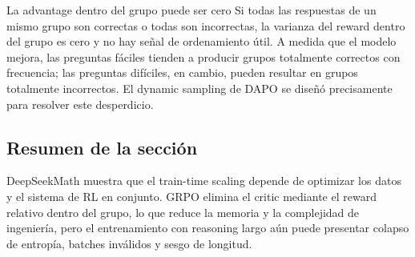 
\begin{warningbox}{La advantage dentro del grupo puede ser cero}
Si todas las respuestas de un mismo grupo son correctas o todas son incorrectas, la varianza del reward dentro del grupo es cero y no hay señal de ordenamiento útil. A medida que el modelo mejora, las preguntas fáciles tienden a producir grupos totalmente correctos con frecuencia; las preguntas difíciles, en cambio, pueden resultar en grupos totalmente incorrectos. El dynamic sampling de DAPO se diseñó precisamente para resolver este desperdicio.
\end{warningbox}

\subsection{Resumen de la sección}

DeepSeekMath muestra que el train-time scaling depende de optimizar los datos y el sistema de RL en conjunto. GRPO elimina el critic mediante el reward relativo dentro del grupo, lo que reduce la memoria y la complejidad de ingeniería, pero el entrenamiento con reasoning largo aún puede presentar colapso de entropía, batches inválidos y sesgo de longitud.
